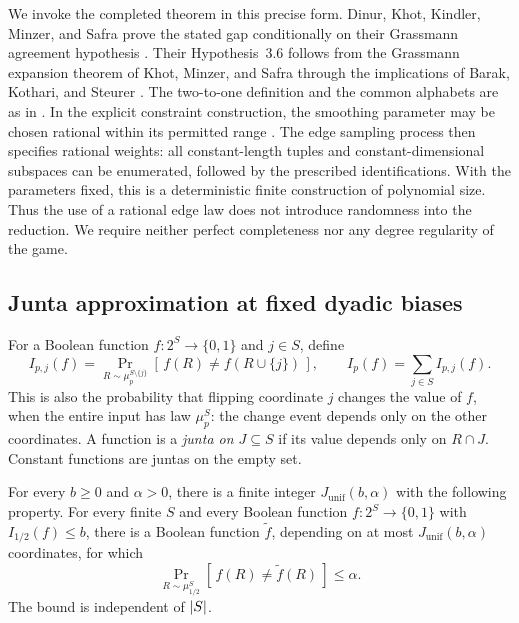 We invoke the completed theorem in this precise form.
Dinur, Khot, Kindler, Minzer, and Safra prove the stated gap
conditionally on their Grassmann agreement hypothesis
\cite[Theorem~1.8]{DKKMS2025}.  Their Hypothesis~3.6 follows from the
Grassmann expansion theorem of Khot, Minzer, and Safra
\cite[Theorem~1.12, ECCC revision~2]{KMS2018} through the implications
of Barak, Kothari, and Steurer
\cite[Section~1.1 and Theorems~9--11]{BKS2019}.
The two-to-one definition and the common alphabets are as in
\cite[Definitions~1.1--1.2 and Section~4.2]{DKKMS2025}.
In the explicit constraint construction, the smoothing parameter may
be chosen rational within its permitted range
\cite[Sections~4.2 and~5.2]{DKKMS2025}. The edge sampling process then
specifies rational weights: all constant-length tuples and constant-dimensional
subspaces can be enumerated, followed by the prescribed identifications.
With the parameters fixed, this is a deterministic finite construction
of polynomial size.  Thus the use of a rational edge law does not
introduce randomness into the reduction.  We require neither perfect
completeness nor any degree regularity of the game.

\subsection{Junta approximation at fixed dyadic biases}

For a Boolean function \(f:2^S\to\{0,1\}\) and \(j\in S\), define
\begin{equation}
\label{eq:biased-influence}
  I_{p,j}(f)
  =\Pr_{R\sim\mu_p^{S\setminus\{j\}}}
       [\,f(R)\ne f(R\cup\{j\})\,],
  \qquad
  I_p(f)=\sum_{j\in S} I_{p,j}(f).
\end{equation}
This is also the probability that flipping coordinate \(j\) changes
the value of \(f\), when the entire input has law \(\mu_p^S\):
the change event depends only on the other coordinates.
A function is a \emph{junta on \(J\subseteq S\)} if its value depends
only on \(R\cap J\).  Constant functions are juntas on the empty set.

\begin{theorem}
\label{thm:friedgut}
For every \(b\ge0\) and \(\alpha>0\), there is a finite integer
\(J_{\mathrm{unif}}(b,\alpha)\) with the following property.
For every finite \(S\) and every Boolean function
\(f:2^S\to\{0,1\}\) with \(I_{1/2}(f)\le b\), there is a Boolean
function \(\widetilde f\), depending on at most
\(J_{\mathrm{unif}}(b,\alpha)\) coordinates, for which
\[
  \Pr_{R\sim\mu_{1/2}^{S}}[\,f(R)\ne\widetilde f(R)\,]\le\alpha.
\]
The bound is independent of \(\lvert S\rvert\).
\end{theorem}

